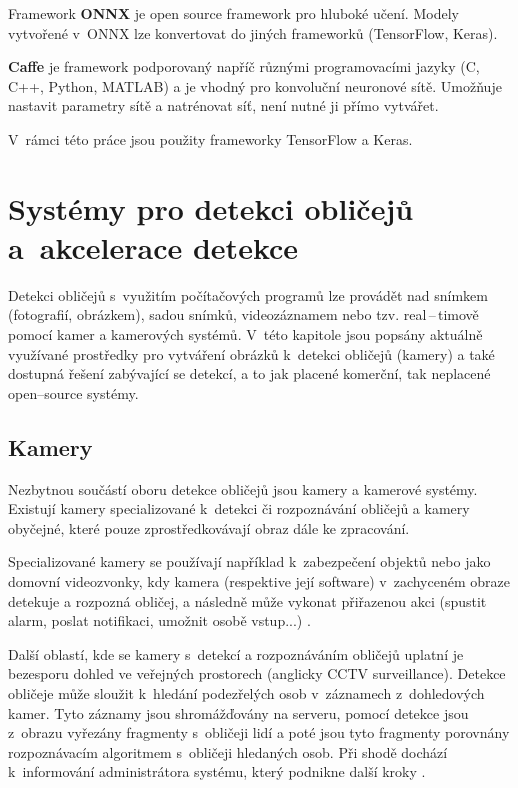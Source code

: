 Framework \textbf{ONNX} je open source framework pro hluboké učení. Modely vytvořené v~ONNX lze konvertovat do jiných frameworků (TensorFlow, Keras).

\textbf{Caffe} je framework podporovaný napříč různými programovacími jazyky (C, C++, Python, MATLAB) a je vhodný pro konvoluční neuronové sítě. Umožňuje nastavit parametry sítě a natrénovat síť, není nutné ji přímo vytvářet.

V~rámci této práce jsou použity frameworky TensorFlow a Keras. 


\chapter{Systémy pro detekci obličejů a~akcelerace detekce}
\label{kapitola:kamery_a_systemy}
Detekci obličejů s~využitím počítačových programů lze provádět nad snímkem 
(fotografií, obrázkem), sadou snímků,
videozáznamem nebo tzv. real\,--\,timově pomocí kamer a kamerových systémů.
V~této kapitole jsou popsány aktuálně využívané prostředky pro vytváření 
obrázků k~detekci obličejů (kamery) a také dostupná řešení zabývající se 
detekcí, a to jak placené komerční, tak neplacené open--source systémy.

\section{Kamery}
Nezbytnou součástí oboru detekce obličejů jsou kamery a kamerové systémy.
Existují kamery specializované k~detekci či rozpoznávání obličejů 
a kamery obyčejné, které pouze zprostředkovávají obraz dále ke zpracování.

Specializované kamery se používají například k~zabezpečení objektů nebo
jako domovní videozvonky, kdy kamera (respektive její software) v~zachyceném
obraze detekuje a rozpozná obličej, a následně může vykonat přiřazenou akci 
(spustit alarm, poslat notifikaci, umožnit osobě vstup...) \cite{securityCamsWeb}.

Další oblastí, kde se kamery s~detekcí a rozpoznáváním obličejů uplatní je
bezesporu dohled ve veřejných prostorech (anglicky CCTV surveillance). 
Detekce obličeje může sloužit k~hledání podezřelých osob v~záznamech z~dohledových
kamer. Tyto záznamy jsou shromážďovány na serveru, pomocí detekce jsou
z~obrazu vyřezány fragmenty s~obličeji lidí a poté jsou tyto fragmenty
porovnány rozpoznávacím algoritmem s~obličeji hledaných osob. Při shodě
dochází k~informování administrátora systému, který podnikne další kroky 
\cite{suspectIdentification}. 

